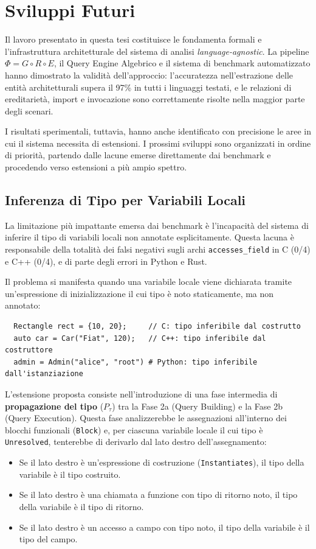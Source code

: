\chapter{Sviluppi Futuri}

Il lavoro presentato in questa tesi costituisce le fondamenta formali
e l'infrastruttura architetturale del sistema di analisi
\textit{language-agnostic}. La pipeline $\Phi = G \circ R \circ E$,
il Query Engine Algebrico e il sistema di benchmark automatizzato
hanno dimostrato la validità dell'approccio: l'accuratezza
nell'estrazione delle entità architetturali supera il 97\% in tutti i
linguaggi testati, e le relazioni di ereditarietà, import e
invocazione sono correttamente risolte nella maggior parte degli
scenari.

I risultati sperimentali, tuttavia, hanno anche identificato con
precisione le aree in cui il sistema necessita di estensioni. I
prossimi sviluppi sono organizzati in ordine di priorità, partendo
dalle lacune emerse direttamente dai benchmark e procedendo verso
estensioni a più ampio spettro.

\section{Inferenza di Tipo per Variabili Locali}
La limitazione più impattante emersa dai benchmark è l'incapacità del
sistema di inferire il tipo di variabili locali non annotate
esplicitamente. Questa lacuna è responsabile della totalità dei falsi
negativi sugli archi \texttt{accesses\_field} in C (0/4) e C++ (0/4),
e di parte degli errori in Python e Rust.

Il problema si manifesta quando una variabile locale viene dichiarata
tramite un'espressione di inizializzazione il cui tipo è noto
staticamente, ma non annotato:
\begin{verbatim}
  Rectangle rect = {10, 20};     // C: tipo inferibile dal costrutto
  auto car = Car("Fiat", 120);   // C++: tipo inferibile dal costruttore
  admin = Admin("alice", "root") # Python: tipo inferibile dall'istanziazione
\end{verbatim}

L'estensione proposta consiste nell'introduzione di una fase
intermedia di \textbf{propagazione del tipo} ($P_\tau$) tra la Fase 2a
(Query Building) e la Fase 2b (Query Execution). Questa fase
analizzerebbe le assegnazioni all'interno dei blocchi funzionali
(\texttt{Block}) e, per ciascuna variabile locale il cui tipo è
\texttt{Unresolved}, tenterebbe di derivarlo dal lato destro
dell'assegnamento:
\begin{itemize}
  \item Se il lato destro è un'espressione di costruzione
    (\texttt{Instantiates}), il tipo della variabile è il tipo
    costruito.
  \item Se il lato destro è una chiamata a funzione con tipo di
    ritorno noto, il tipo della variabile è il tipo di ritorno.
  \item Se il lato destro è un accesso a campo con tipo noto, il tipo
    della variabile è il tipo del campo.
\end{itemize}

